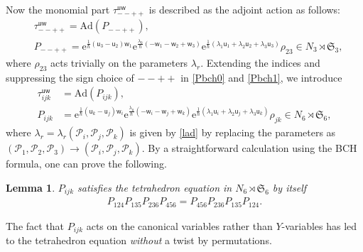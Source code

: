 \documentclass[11pt]{article}
\numberwithin{equation}{section}
\newcommand{\e}{{\mathrm e}}
\newcommand{\uu}{{\mathsf u}}
\newcommand{\ww}{{\mathsf w}}
\numberwithin{equation}{section}
\newtheorem{Lemma}[Theorem]{Lemma}
\begin{document}
Now the monomial part $\tau^{\uu\ww}_{--++}$
is described as the adjoint action as follows:
\begin{align}
&\tau^{\uu\ww}_{--++} = \mathrm{Ad}(P_{--++}),
\label{Pbch0}\\
&P_{--++}=
\e^{\tfrac{1}{\hbar}(\uu_3-\uu_2)\ww_1}
\e^{\tfrac{\lambda_0}{\hbar}(-\ww_1-\ww_2+\ww_3)}
\e^{\tfrac{1}{\hbar}(\lambda_1\uu_1+\lambda_2\uu_2+\lambda_3\uu_3)}\rho_{23}
\in N_3 \rtimes \mathfrak{S}_3,
\label{Pbch1}
\end{align}
where $\rho_{23}$ acts trivially on the parameters $\lambda_r$.
%
Extending the indices and suppressing the sign choice of $--++$ in \eqref{Pbch0} and \eqref{Pbch1}, we introduce
\begin{align}
\tau^{\uu\ww}_{ijk} &= \mathrm{Ad}(P_{ijk}),
\label{tijk}\\
P_{ijk} &=
\e^{\tfrac{1}{\hbar}(\uu_k-\uu_j)\ww_i}
\e^{\tfrac{\lambda_0}{\hbar}(-\ww_i-\ww_j+\ww_k)}
\e^{\tfrac{1}{\hbar}(\lambda_1\uu_i+\lambda_2\uu_j+\lambda_3\uu_k)}\rho_{jk}
\in N_6 \rtimes \mathfrak{S}_6,
\label{pijk}
\end{align}
where $\lambda_r=\lambda_r(\mathscr{P}_i, \mathscr{P}_j, \mathscr{P}_k)$ is given by
\eqref{lad} by replacing the parameters as
$(\mathscr{P}_1 ,\mathscr{P}_2 ,\mathscr{P}_3) \rightarrow
(\mathscr{P}_i ,\mathscr{P}_j ,\mathscr{P}_k)$.
%
By a straightforward calculation using the BCH formula, one can prove the following.
\begin{Lemma}\label{le:tep}
$P_{ijk}$ satisfies the tetrahedron equation in $N_6 \rtimes \mathfrak{S}_6$ by itself
\begin{align}\label{pte}
P_{124}P_{135}P_{236}P_{456} =
P_{456}P_{236}P_{135}P_{124}.
\end{align}
\end{Lemma}
The fact that $P_{ijk}$ acts on the canonical variables rather than $Y$-variables
has led to the tetrahedron equation {\em without} a twist by permutations.
\end{document}
